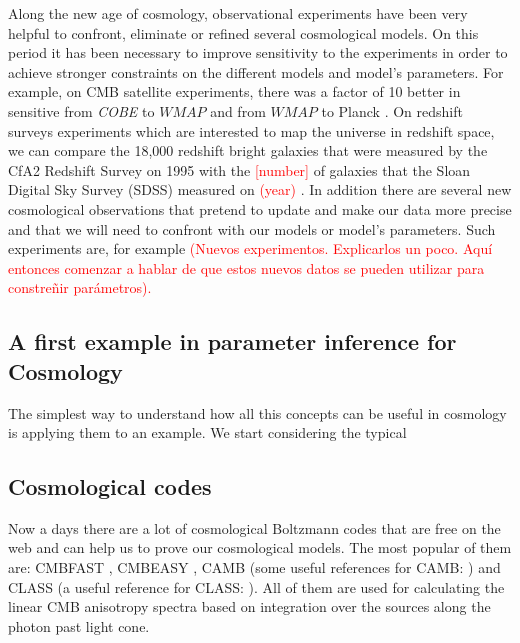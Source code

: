 \documentclass[onecolumn,           %
               showpacs,            %
               preprintnumbers,     %
               aps,                 %
               prl,          	    %
               letterpaper,             %
               superscriptaddress,      %
               nofootinbib,         %
               tightenlines,        %
               floats,floatfix      %
               ,usenatbib,
               ]{revtex4-1}
\begin{document}
Along the new age of cosmology, observational experiments have been very helpful to confront, eliminate or refined several cosmological models. On this period it has been necessary to improve sensitivity to the experiments in order to achieve stronger constraints on the different models and model's parameters. For example, on CMB satellite experiments, there was a factor of 10 better in sensitive from \textit{COBE} to $WMAP$ and from $WMAP$ to Planck \cite{cmbex}.  On redshift surveys experiments which are interested to map the universe in redshift space, we can compare the 18,000 redshift bright galaxies that were measured by the CfA2 Redshift Survey on 1995 with the \textcolor{red}{[number]} of galaxies that the Sloan Digital Sky Survey (SDSS) measured on \textcolor{red}{(year)} \cite{observ}. In addition there are several new cosmological observations that pretend to update and make our data more precise and that we will need to confront with our models or model's parameters. Such experiments are, for example \textcolor{red}{(Nuevos experimentos. Explicarlos un poco. Aqu\'i entonces comenzar a hablar de que estos nuevos datos se pueden utilizar para constre\~nir par\'ametros).}

\subsection{A first example in parameter inference for Cosmology}

The simplest way to understand how all this concepts can be useful in cosmology is applying them to an example. We start considering the typical  

\subsection{Cosmological codes}

Now a days there are a lot of cosmological Boltzmann codes that are free on the web and can help us to prove our cosmological models. The most popular of them are: CMBFAST \cite{cmbfast1}, CMBEASY \cite{cmbeasy}, CAMB \cite{camb1} (some useful references for CAMB: \cite{camb2,camb3,camb4}) and CLASS \cite{class1} (a useful reference for CLASS: \cite{mont1}). All of them are used for calculating the linear CMB anisotropy spectra based on integration over the sources along the photon past light cone.

\end{document}
